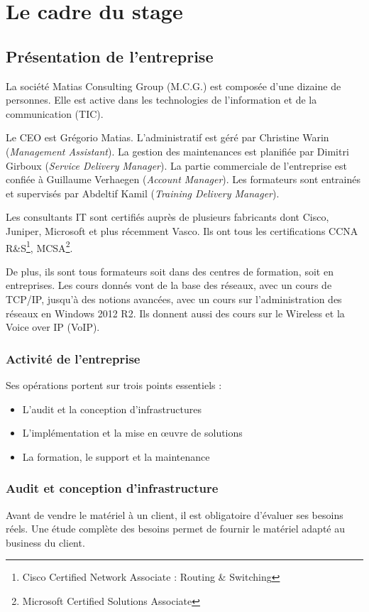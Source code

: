 \chapter{Le cadre du stage}
\section{Présentation de l'entreprise}
La société Matias Consulting Group (M.C.G.) est composée d'une dizaine de personnes. 
Elle est active dans les technologies de l'information et de la communication (TIC).

Le CEO est Grégorio Matias.
L'administratif est géré par Christine Warin (\textit{Management Assistant}).
La gestion des maintenances est planifiée par Dimitri Girboux (\textit{Service Delivery Manager}).
La partie commerciale de l'entreprise est confiée à Guillaume Verhaegen (\textit{Account Manager}).
Les formateurs sont entrainés et supervisés par Abdeltif Kamil (\textit{Training Delivery Manager}).

Les consultants IT sont certifiés auprès de plusieurs fabricants dont Cisco, Juniper, Microsoft et plus récemment Vasco.
Ils ont tous les certifications CCNA R\&S\footnote{Cisco Certified Network Associate : Routing \& Switching}, MCSA\footnote{Microsoft Certified Solutions Associate}.

De plus, ils sont tous formateurs soit dans des centres de formation, soit en entreprises.
Les cours donnés vont de la base des réseaux, avec un cours de TCP/IP, jusqu'à des notions avancées, avec un cours sur l'administration des réseaux en Windows 2012 R2. 
Ils donnent aussi des cours sur le Wireless et la Voice over IP (VoIP).

\subsection{Activité de l'entreprise}

Ses opérations portent sur trois points essentiels : 
\begin{itemize}
	\item L'audit et la conception d'infrastructures
	\item L'implémentation et la mise en œuvre de solutions
	\item La formation, le support et la maintenance
\end{itemize}

\subsection*{Audit et conception d'infrastructure}
Avant de vendre le matériel à un client, il est obligatoire d'évaluer ses besoins réels.
Une étude complète des besoins permet de fournir le matériel adapté au business du client.


